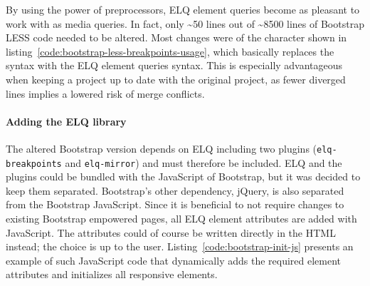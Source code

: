 \documentclass[a4paper,11pt]{kth-mag}
\newcommand{\code}[1]{\texttt{#1}}
\begin{document}
      By using the power of preprocessors, \gls{ELQ} element queries become as pleasant to work with as \gls{media queries}.
      In fact, only \textasciitilde50 lines out of \textasciitilde8500 lines of \gls{Bootstrap} \gls{LESS} code needed to be altered.
      Most changes were of the character shown in listing~\ref{code:bootstrap-less-breakpoints-usage}, which basically replaces the  syntax with the \gls{ELQ} element queries syntax.
      This is especially advantageous when keeping a  project up to date with the original project, as fewer diverged lines implies a lowered risk of merge conflicts.

      \paragraph{Adding the \gls{ELQ} library}
      The altered \gls{Bootstrap} version depends on \gls{ELQ} including two plugins (\code{elq-breakpoints} and \code{elq-mirror}) and must therefore be included.
      \gls{ELQ} and the plugins could be bundled with the \gls{JavaScript} of \gls{Bootstrap}, but it was decided to keep them separated.
      \gls{Bootstrap}'s other dependency, jQuery, is also separated from the \gls{Bootstrap} \gls{JavaScript}.
      Since it is beneficial to not require changes to existing \gls{Bootstrap} empowered pages, all \gls{ELQ} element attributes are added with \gls{JavaScript}.
      The attributes could of course be written directly in the \gls{HTML} instead; the choice is up to the user.
      Listing~\ref{code:bootstrap-init-js} presents an example of such \gls{JavaScript} code that dynamically adds the required element attributes and initializes all \gls{responsive} \glspl{element}.
\end{document}

